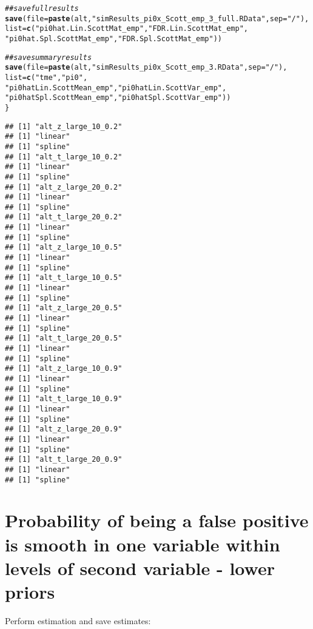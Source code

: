 \documentclass{article}\usepackage[]{graphicx}\usepackage[]{color}
\makeatletter
\newcommand{\hlstr}[1]{\textcolor[rgb]{0.192,0.494,0.8}{#1}}%
\newcommand{\hlcom}[1]{\textcolor[rgb]{0.678,0.584,0.686}{\textit{#1}}}%
\newcommand{\hlstd}[1]{\textcolor[rgb]{0.345,0.345,0.345}{#1}}%
\newcommand{\hlkwc}[1]{\textcolor[rgb]{0.333,0.667,0.333}{#1}}%
\newcommand{\hlkwd}[1]{\textcolor[rgb]{0.737,0.353,0.396}{\textbf{#1}}}%
\newenvironment{kframe}{%
 \def\at@end@of@kframe{}%
 \ifinner\ifhmode%
  \def\at@end@of@kframe{\end{minipage}}%
  \begin{minipage}{\columnwidth}%
 \fi\fi%
 \def\FrameCommand##1{\hskip\@totalleftmargin \hskip-\fboxsep
 \colorbox{shadecolor}{##1}\hskip-\fboxsep
     \hskip-\linewidth \hskip-\@totalleftmargin \hskip\columnwidth}%
 \MakeFramed {\advance\hsize-\width
   \@totalleftmargin\z@ \linewidth\hsize
   \@setminipage}}%
 {\par\unskip\endMakeFramed%
 \at@end@of@kframe}
\newenvironment{knitrout}{}{} %
\makeatother
\begin{document}
\begin{knitrout}
\begin{kframe}
\begin{alltt}
  \hlcom{##save full results}
  \hlkwd{save}\hlstd{(}\hlkwc{file}\hlstd{=}\hlkwd{paste}\hlstd{(alt,}\hlstr{"simResults_pi0x_Scott_emp_3_full.RData"}\hlstd{,}\hlkwc{sep}\hlstd{=}\hlstr{"/"}\hlstd{),}
       \hlkwc{list}\hlstd{=}\hlkwd{c}\hlstd{(}\hlstr{"pi0hat.Lin.ScottMat_emp"}\hlstd{,} \hlstr{"FDR.Lin.ScottMat_emp"}\hlstd{,}
              \hlstr{"pi0hat.Spl.ScottMat_emp"}\hlstd{,} \hlstr{"FDR.Spl.ScottMat_emp"}\hlstd{))}

  \hlcom{##save summary results}
  \hlkwd{save}\hlstd{(}\hlkwc{file}\hlstd{=}\hlkwd{paste}\hlstd{(alt,}\hlstr{"simResults_pi0x_Scott_emp_3.RData"}\hlstd{,}\hlkwc{sep}\hlstd{=}\hlstr{"/"}\hlstd{),}
       \hlkwc{list}\hlstd{=}\hlkwd{c}\hlstd{(}\hlstr{"tme"}\hlstd{,} \hlstr{"pi0"}\hlstd{,}
              \hlstr{"pi0hatLin.ScottMean_emp"}\hlstd{,} \hlstr{"pi0hatLin.ScottVar_emp"}\hlstd{,}
              \hlstr{"pi0hatSpl.ScottMean_emp"}\hlstd{,} \hlstr{"pi0hatSpl.ScottVar_emp"}\hlstd{))}
\hlstd{\}}
\end{alltt}
\begin{verbatim}
## [1] "alt_z_large_10_0.2"
## [1] "linear"
## [1] "spline"
## [1] "alt_t_large_10_0.2"
## [1] "linear"
## [1] "spline"
## [1] "alt_z_large_20_0.2"
## [1] "linear"
## [1] "spline"
## [1] "alt_t_large_20_0.2"
## [1] "linear"
## [1] "spline"
## [1] "alt_z_large_10_0.5"
## [1] "linear"
## [1] "spline"
## [1] "alt_t_large_10_0.5"
## [1] "linear"
## [1] "spline"
## [1] "alt_z_large_20_0.5"
## [1] "linear"
## [1] "spline"
## [1] "alt_t_large_20_0.5"
## [1] "linear"
## [1] "spline"
## [1] "alt_z_large_10_0.9"
## [1] "linear"
## [1] "spline"
## [1] "alt_t_large_10_0.9"
## [1] "linear"
## [1] "spline"
## [1] "alt_z_large_20_0.9"
## [1] "linear"
## [1] "spline"
## [1] "alt_t_large_20_0.9"
## [1] "linear"
## [1] "spline"
\end{verbatim}
\end{kframe}
\end{knitrout}

\section{Probability of being a false positive is smooth in one variable within levels of second variable - lower priors}

Perform estimation and save estimates:
\end{document}
